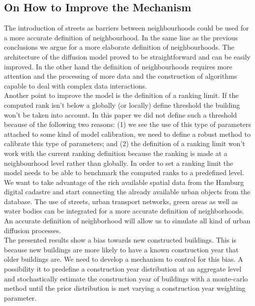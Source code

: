 \subsection{On How to Improve the Mechanism}

The introduction of streets as barriers between neighbourhoods could be used
for a more accurate definition of neighbourhood. In the same line as the
previous conclusions we argue for a more elaborate definition of
neighbourhoods. The architecture of the diffusion model proved to be
straightforward and can be easily improved. In the other hand the definition
of neighbourhoods requires more attention and the processing of more data and
the construction of algorithms capable to deal with complex data
interactions.\\

Another point to improve the model is the definition of a ranking limit. If the
computed rank isn't below a globally (or locally) define threshold the building
won't be taken into account. In this paper we did not define such a threshold
because of the following two reasons: (1) we see the use of this type of
parameters attached to some kind of model calibration, we need to define a
robust method to calibrate this type of parameters; and (2) the definition of a
ranking limit won't work with the current ranking definition because the
ranking is made at a neighbourhood level rather than globally. In order to set
a ranking limit the model needs to be able to benchmark the computed ranks to a
predefined level.\\

We want to take advantage of the rich available spatial data from the Hamburg
digital cadastre and start connecting the already available urban objects from
the database. The use of streets, urban transport networks, green areas as well
as water bodies can be integrated for a more accurate definition of
neighborhoods. An accurate definition of neighborhood will allow us to simulate
all kind of urban diffusion processes.\\

The presented results show a bias towards new constructed buildings. This is
because new buildings are more likely to have a known construction year that
older buildings are. We need to develop a mechanism to control for this bias. A
possibility it to predefine a construction year distribution at an aggregate
level and stochastically estimate the construction year of buildings with a
monte-carlo method until the prior distribution is met varying a construction
year weighting parameter.\\

